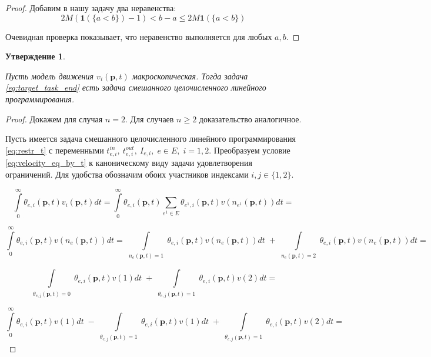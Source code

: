 \documentclass[12pt, a4paper]{article}
\newtheorem{state}{Утверждение}[section]
\begin{document}
\begin{proof}
	Добавим в нашу задачу два неравенства:
	$$ 2M (\textbf{1} (\{a < b\}) - 1) < b - a \le 2M\textbf{1} (\{a < b\}) $$
	
	Очевидная проверка показывает, что неравенство выполняется для любых $a, b$.
	
	
\end{proof}

\begin{state}
	
	\label{state:lin_prog}
	
	Пусть модель движения $ v_i(\textbf{p}, t)$ макроскопическая. Тогда задача \eqref{eq:target_task_end} есть задача смешанного целочисленного линейного программирования.
\end{state}

\begin{proof}
	Докажем для случая $n = 2$. Для случаев $n \ge 2$ доказательство аналогичное.
	
	Пусть имеется задача смешанного целочисленного линейного программирования \eqref{eq:restr_t} с переменными $t_{e, i}^{in}, \: t_{e, i}^{out}, \: I_{e, i}, \; e \in E, \; i = 1, 2$. Преобразуем условие \eqref{eq:velocity_eq_by_t} к каноническому виду задачи удовлетворения ограничений. Для удобства обозначим обоих участников индексами $i, j \in \{1, 2\}$.
	
	$$\int\limits_{0}^{\infty} \theta_{e, i} (\textbf{p}, t) v_i(\textbf{p}, t)dt = \int\limits_{0}^{\infty} \theta_{e, i} (\textbf{p}, t) \sum \limits _{e^1 \in E} \theta_{e^1, i} (\textbf{p}, t) v (n_{e^1} (\textbf{p}, t)) dt = $$
	
	$$\int\limits_{0}^{\infty} \theta_{e, i} (\textbf{p}, t)  v (n_{e} (\textbf{p}, t)) dt = 
	  \int\limits_{ \substack{n_{e} (\textbf{p}, t) = 1}} \theta_{e, i} (\textbf{p}, t)  v (n_{e} (\textbf{p}, t)) dt \; +
	  \int\limits_{ \substack{n_{e} (\textbf{p}, t) = 2}} \theta_{e, i} (\textbf{p}, t)  v (n_{e} (\textbf{p}, t)) dt = $$
	
	$$\int\limits_{ \substack{\theta_{e, j} (\textbf{p}, t) = 0}} \theta_{e, i} (\textbf{p}, t)  v (1) dt \; +
	  \int\limits_{ \substack{\theta_{e, j} (\textbf{p}, t) = 1}} \theta_{e, i} (\textbf{p}, t)  v (2) dt = $$
	  
    $$\int\limits_{0}^{\infty} \theta_{e, i} (\textbf{p}, t)  v (1) dt \; - 
      \int\limits_{ \substack{\theta_{e, j} (\textbf{p}, t) = 1}} \theta_{e, i} (\textbf{p}, t)  v (1) dt \; +
	  \int\limits_{ \substack{\theta_{e, j} (\textbf{p}, t) = 1}} \theta_{e, i} (\textbf{p}, t)  v (2) dt = $$
	  

\end{proof}
\end{document}
